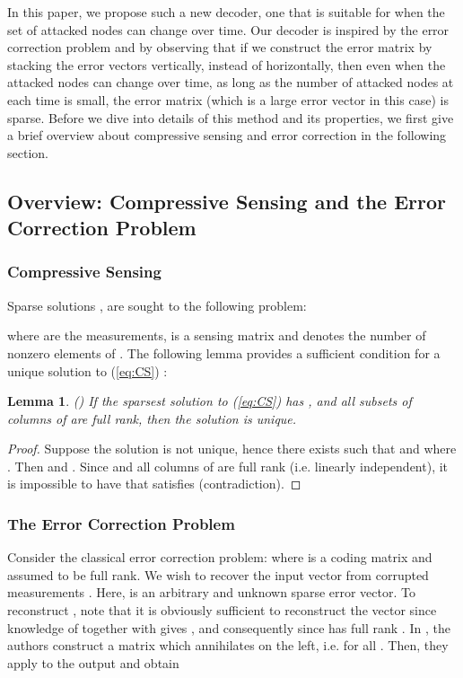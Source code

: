 \documentclass[journal]{IEEEtran}
\newtheorem{lem}{\bf{Lemma}}
\begin{document}
In this paper, we propose such a new decoder, one that is suitable for when the set of attacked nodes can change over time. Our decoder is inspired by the error correction problem \cite{Candes_Tao} and by observing that if we construct the error matrix by stacking the error vectors  vertically, instead of horizontally, then even when the attacked nodes can change over time, as long as the number of attacked nodes at each time  is small, the error matrix (which is a large error vector in this case) is sparse. Before we dive into details of this method and its properties, we first give a brief overview about compressive sensing and error correction in the following section.




\subsection{Overview: Compressive Sensing and the Error Correction Problem \cite{Candes_Tao}} 

\subsubsection{Compressive Sensing}
Sparse solutions , are sought to the following problem:

where  are the measurements,  is a sensing matrix and  denotes the number of nonzero elements of . The following lemma provides a sufficient condition for a unique solution to (\ref{eq:CS}) \cite{Candes_Tao}:

\begin{lem} \emph{(\hspace{1sp}\cite{David_Chang})} \label{lem:CS}
If the sparsest solution to (\ref{eq:CS}) has ,  and all subsets of  columns of  are full rank, then the solution is unique. 
\end{lem}
\begin{proof}
Suppose the solution is not unique, hence there exists  such that  and  where . Then  and . Since  and all  columns of  are full rank (i.e. linearly independent), it is impossible to have  that satisfies  (contradiction).
\end{proof}



\subsubsection{The Error Correction Problem  \cite{Candes_Tao}} \label{sec:error_correction}
Consider the classical error correction problem:  where  is a coding matrix  and assumed to be full rank. We wish to recover the input vector  from corrupted measurements . Here,  is an arbitrary and unknown sparse error vector. To reconstruct , note that it is obviously sufficient to reconstruct the vector  since knowledge of  together with  gives , and consequently  since  has full rank \cite{Candes_Tao}. In \cite{Candes_Tao}, the authors construct a matrix  which annihilates  on the left, i.e.   for all . Then, they apply  to the output  and obtain
\end{document}
